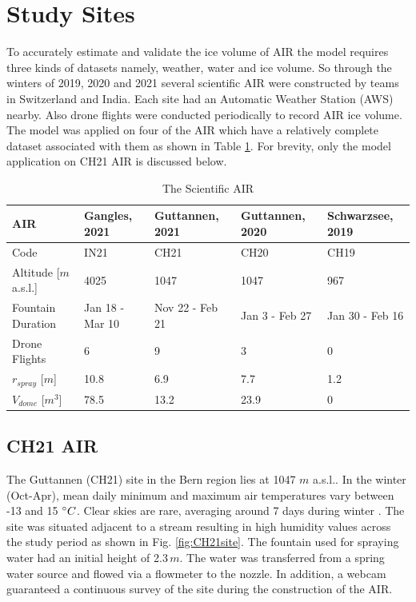 \documentclass[utf8]{frontiersSCNS} %
\begin{document}
\section{Study Sites}
To accurately estimate and validate the ice volume of AIR the model requires three kinds of datasets namely, weather,
water and ice volume. So through the winters of 2019, 2020 and 2021 several scientific AIR were constructed by teams in
Switzerland and India. Each site had an Automatic Weather Station (AWS) nearby. Also drone flights were conducted
periodically to record AIR ice volume. The model was applied on four of the AIR which have a relatively complete dataset
associated with them as shown in Table \ref{tab:4AIR}. For brevity, only the model application on CH21 AIR is
discussed below.

\begin{table}
\centering
\caption{The Scientific AIR}
\label{tab:4AIR}
\begin{tabular}{@{}|l|l|l|l|l|@{}}
\toprule
\textbf{AIR}      & \textbf{Gangles, 2021} & \textbf{Guttannen, 2021} & \textbf{Guttannen, 2020} & \textbf{Schwarzsee, 2019} \\ \midrule
Code                      & IN21 & CH21 & CH20 & CH19 \\ \midrule
Altitude {[}$m$ a.s.l.{]} & 4025 & 1047 & 1047 & 967  \\ \midrule
Fountain Duration & Jan 18 - Mar 10        & Nov 22 - Feb 21          & Jan 3 - Feb 27           & Jan 30 - Feb 16           \\ \midrule
Drone Flights             & 6    & 9    & 3    & 0    \\ \midrule
$r_{spray}$ {[}$m${]}     & 10.8 & 6.9  & 7.7  & 1.2  \\ \midrule
$V_{dome}$ {[}$m^{3}${]}  & 78.5 & 13.2 & 23.9 & 0    \\ \bottomrule
\end{tabular}
\end{table}

\subsection{CH21 AIR}

The Guttannen (CH21) site in the Bern region lies at 1047 $m$ a.s.l.. In the winter (Oct-Apr), mean daily minimum and
maximum air temperatures vary between -13 and 15 $\degree C$. Clear skies are rare, averaging around 7 days during
winter \citep{eispalast}. The site was situated adjacent to a stream resulting in high humidity values across the study
period as shown in Fig. \ref{fig:CH21site}. The fountain used for spraying water had an initial height of 2.3\,$m$. The
water was transferred from a spring water source and flowed via a flowmeter to the nozzle.  In addition, a webcam
guaranteed a continuous survey of the site during the construction of the AIR.
\end{document}
